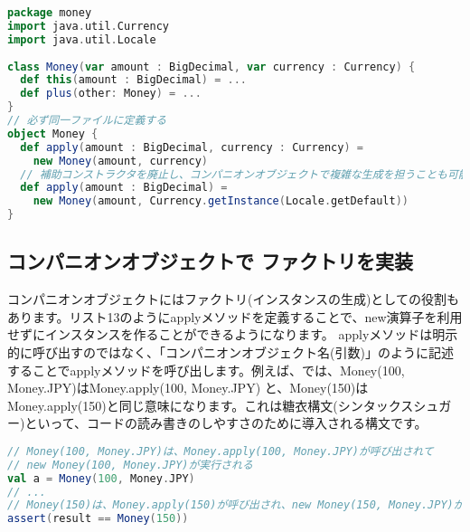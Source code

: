 \begin{lstlisting}[language=scala, label=src:factory_method, caption=コンパニオンオブジェクト内部にファクトリメソッド(applyメソッド)を定義する]
package money
import java.util.Currency
import java.util.Locale
 
class Money(var amount : BigDecimal, var currency : Currency) {
  def this(amount : BigDecimal) = ...
  def plus(other: Money) = ...
}
// 必ず同一ファイルに定義する
object Money {
  def apply(amount : BigDecimal, currency : Currency) =
    new Money(amount, currency)
  // 補助コンストラクタを廃止し、コンパニオンオブジェクトで複雑な生成を担うことも可能
  def apply(amount : BigDecimal) =
    new Money(amount, Currency.getInstance(Locale.getDefault))
}
\end{lstlisting}

\subsection{コンパニオンオブジェクトで ファクトリを実装}
コンパニオンオブジェクトにはファクトリ(インスタンスの生成)としての役割もあります。リスト13のようにapplyメソッドを定義することで、new演算子を利用せずにインスタンスを作ることができるようになります。 applyメソッドは明示的に呼び出すのではなく、「コンパニオンオブジェクト名(引数)」のように記述することでapplyメソッドを呼び出します。例えば、では、Money(100, Money.JPY)はMoney.apply(100, Money.JPY) と、Money(150)はMoney.apply(150)と同じ意味になります。これは糖衣構文(シンタックスシュガー)といって、コードの読み書きのしやすさのために導入される構文です。

\begin{lstlisting}[language=scala, label=src:apply_method, caption=applyメソッドの呼び出し例。糖衣構文により簡単に呼び出せる]
// Money(100, Money.JPY)は、Money.apply(100, Money.JPY)が呼び出されて
// new Money(100, Money.JPY)が実行される
val a = Money(100, Money.JPY)
// ...
// Money(150)は、Money.apply(150)が呼び出され、new Money(150, Money.JPY)が実行される
assert(result == Money(150))
\end{lstlisting}


